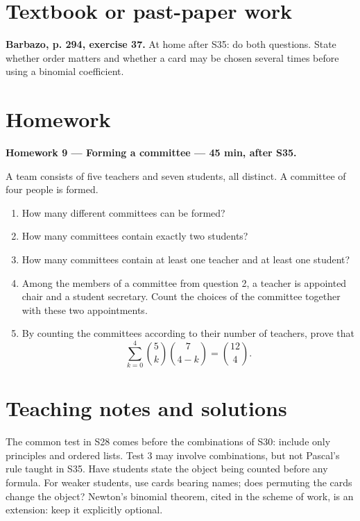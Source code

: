 \section{Textbook or past-paper work}\textbf{Barbazo, p. 294, exercise 37.} At home after S35: do both questions. State whether order matters and whether a card may be chosen several times before using a binomial coefficient.

\mxnewpage
\section{Homework}\textbf{Homework 9 --- Forming a committee --- 45 min, after S35.}\par A team consists of five teachers and seven students, all distinct. A committee of four people is formed.
\begin{enumerate}\item How many different committees can be formed?
\item How many committees contain exactly two students?
\item How many committees contain at least one teacher and at least one student?
\item Among the members of a committee from question 2, a teacher is appointed chair and a student secretary. Count the choices of the committee together with these two appointments.
\item By counting the committees according to their number of teachers, prove that \[\sum_{k=0}^4\binom5k\binom7{4-k}=\binom{12}4.\]\end{enumerate}

\ifmxteacher\mxnewpage\section{Teaching notes and solutions}\begin{teachernote}The common test in S28 comes before the combinations of S30: include only principles and ordered lists. Test 3 may involve combinations, but not Pascal's rule taught in S35. Have students state the object being counted before any formula. For weaker students, use cards bearing names; does permuting the cards change the object? Newton's binomial theorem, cited in the scheme of work, is an extension: keep it explicitly optional.\end{teachernote}


